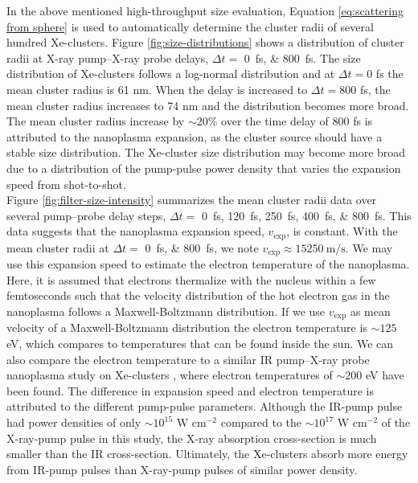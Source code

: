 In the above mentioned high-throughput size evaluation, Equation \eqref{eq:scattering from sphere} is used to automatically determine the cluster radii of several hundred Xe-clusters. Figure \ref{fig:size-distributions} shows a distribution of cluster radii at X-ray pump--X-ray probe delays, $\Delta t =$ \SIlist{0;800}{\femto\second}. The size distribution of Xe-clusters follows a log-normal distribution \citep{Schutte-2002-IJMS} and at $\Delta t=0$ fs the mean cluster radius is 61 nm. When the delay is increased to $\Delta t=800$ fs, the mean cluster radius increases to 74 nm and the distribution becomes more broad. The mean cluster radius increase by $\sim 20 \%$ over the time delay of 800 fs is attributed to the nanoplasma expansion, as the cluster source should have a stable size distribution. The Xe-cluster size distribution may become more broad due to a distribution of the pump-pulse power density that varies the expansion speed from shot-to-shot.\\[1\baselineskip]
%
Figure \ref{fig:filter-size-intensity} summarizes the mean cluster radii data over several pump--probe delay steps, $\Delta t=$ \SIlist{0;120;250;400;800}{\femto\second}. This data suggests that the nanoplasma expansion speed, $v_{\text{exp}}$, is constant. With the mean cluster radii at $\Delta t=$ \SIlist{0;800}{\femto\second}, we note $v_{\text{exp}}\approx \SI{15250}{\meter\per\second}$. We may use this expansion speed to estimate the electron temperature of the nanoplasma. Here, it is assumed that electrons thermalize with the nucleus within a few femtoseconds such that the velocity distribution of the hot electron gas in the nanoplasma follows a Maxwell-Boltzmann distribution. If we use $v_{\text{exp}}$ as mean velocity of a Maxwell-Boltzmann distribution the electron temperature is $\sim 125$ eV, which compares to temperatures that can be found inside the sun. We can also compare the electron temperature to a similar IR pump--X-ray probe nanoplasma study on Xe-clusters \citep{Gorkhover-2016-NatPho}, where electron temperatures of $\sim 200$ eV have been found. The difference in expansion speed and electron temperature is attributed to the different pump-pulse parameters. Although the IR-pump pulse had power densities of only $\sim 10^{15}$ W cm$^{-2}$ compared to the $\sim 10^{17}$ W cm$^{-2}$ of the X-ray-pump pulse in this study, the X-ray absorption cross-section is much smaller than the IR cross-section. Ultimately, the Xe-clusters absorb more energy from IR-pump pulses than X-ray-pump pulses of similar power density.\\[1\baselineskip]
